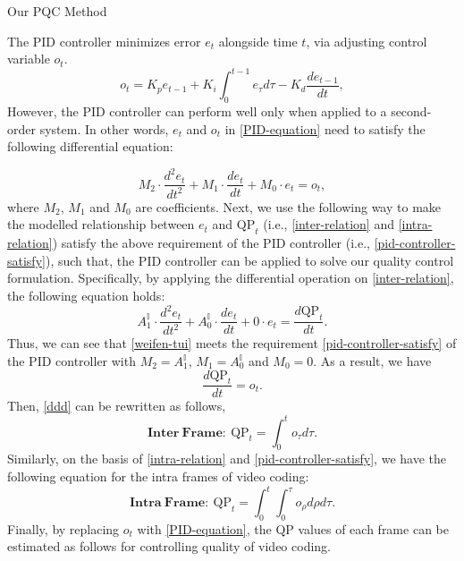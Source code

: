 \documentclass[final]{beamer}
\newlength{\onecolwid}
\newlength{\twocolwid}
\begin{document}
\begin{frame}[t]
\begin{columns}[t]
\begin{column}{\twocolwid}
\begin{columns}[t,totalwidth=\twocolwid]
\begin{column}{\onecolwid}
\begin{block}{Our PQC Method}

The PID controller minimizes error $e_t$ alongside time $t$, via adjusting control variable $o_t$.
\begin{equation}
\label{PID-equation}
o_t=K_pe_{t-1}+K_i\int^{t-1}_0e_{\tau}d{\tau}-K_d\dfrac{de_{t-1}}{dt},
\end{equation}
However, the PID controller can perform well only when applied to a second-order system. In other words, $e_t$ and $o_t$ in \eqref{PID-equation} need to satisfy the following differential equation:

\begin{equation}
\label{pid-controller-satisfy}
M_2 \cdot \frac{d^2e_t}{dt^2} + M_1 \cdot \frac{de_t}{dt} + M_0 \cdot e_t = o_t,
\end{equation}
where $M_2$, $M_1$ and $M_0$ are coefficients. Next, we use the following way to make the modelled relationship between $e_t$ and $\mathrm{QP}_{t}$ (i.e., \eqref{inter-relation} and \eqref{intra-relation}) satisfy the above requirement of the PID controller (i.e., \eqref{pid-controller-satisfy}), such that, the PID controller can be applied to solve our quality control formulation. Specifically, by applying the differential operation on \eqref{inter-relation}, the following equation holds:
\begin{equation}
\label{weifen-tui}
A_1^\mathbb{I} \cdot \frac{d^2e_t}{dt^2} + A_0^\mathbb{I} \cdot \frac{de_t}{dt} +0 \cdot e_t= \frac{d\mathrm{QP}_t}{dt}.
\end{equation}
Thus, we can see that \eqref{weifen-tui} meets the requirement \eqref{pid-controller-satisfy} of the PID controller with $M_2=A_1^\mathbb{I}$, $M_1=A_0^\mathbb{I}$ and $M_0=0$. As a result, we have
\begin{equation}
\label{ddd}
\frac{d\mathrm{QP}_t}{dt}=o_t.
\end{equation}
Then, \eqref{ddd} can be rewritten as follows,
\begin{equation}
\mathbf{Inter~Frame:~}\mathrm{QP}_{t}=\int^t_0 o_\tau d\tau.
\end{equation}
Similarly, on the basis of \eqref{intra-relation} and \eqref{pid-controller-satisfy}, we have the following equation for the intra frames of video coding:
\begin{equation}
\mathbf{Intra~Frame:~}\mathrm{QP}_{t}=\int_0^{t}\int_0^{\tau} o_\rho d{\rho}d{\tau}.
\end{equation}
Finally, by replacing $o_t$ with \eqref{PID-equation}, the $\mathrm{QP}$ values of each frame can be estimated as follows for controlling quality of video coding.

\end{block}
\end{column}
\end{columns}
\end{column}
\end{columns}
\end{frame}
\end{document}
